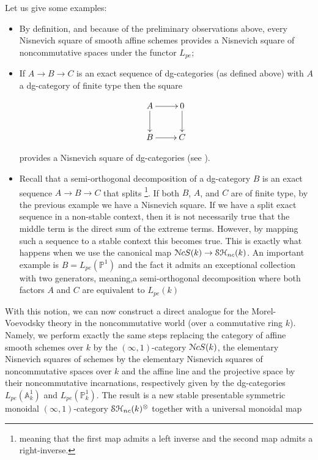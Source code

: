 \begin{refsection}
Let us give some examples:

\begin{example}
\hfill
\begin{itemize}
\item By definition, and because of the preliminary observations above, every Nisnevich square of smooth affine schemes provides a Nisnevich square of noncommutative spaces under the functor $L_{pe}$;
\item If $A\to B \to C$ is an exact sequence of dg-categories (as defined above) with $A$ a dg-category of finite type then the square

$$
\xymatrix{
A\ar[r]\ar[d]& 0 \ar[d]\\
B\ar[r]& C
}
$$

\noindent provides a Nisnevich square of dg-categories (see \cite[6.47]{nc1}).
\item Recall that a semi-orthogonal decomposition of a dg-category $B$ is an exact sequence $A\to B\to C$ that splits \footnote{meaning that the first map admits a left inverse and the second map admits a right-inverse.}. If both $B$, $A$, and $C$ are of finite type, by the previous example we have a Nisnevich square. If we have a split exact sequence in a non-stable context, then it is not necessarily true that the middle term is the direct sum of the extreme terms. However, by mapping such a sequence to a stable context this becomes true. This is exactly what happens when we use the canonical map $\mathcal{N}cS(k)\to \mathcal{S}\mathcal{H}_{nc}(k)$. An important example is $B= L_{pe}(\mathbb{P}^1)$ and the fact it admits an exceptional collection with two generators, meaning,a semi-orthogonal decomposition where both factors $A$ and $C$ are equivalent to $L_{pe}(k)$
\end{itemize}
\end{example}

With this notion, we can now construct a direct analogue for the Morel-Voevodsky theory in the noncommutative world (over a commutative ring $k$). Namely, we perform exactly the same steps replacing the category of affine smooth schemes over $k$ by the $(\infty,1)$-category $\mathcal{N}cS(k)$, the elementary Nisnevich squares of schemes by the elementary Nisnevich squares of noncommutative spaces over $k$ and the affine line and the projective space by their noncommutative incarnations, respectively given by the dg-categories $L_{pe}(\mathbb{A}^1_k)$ and $L_{pe}(\mathbb{P}^1_k)$. The result is a new stable presentable symmetric monoidal $(\infty,1)$-category $\mathcal{S}\mathcal{H}_{nc}(k)^{\otimes}$ together with a universal monoidal map 


\end{refsection}
